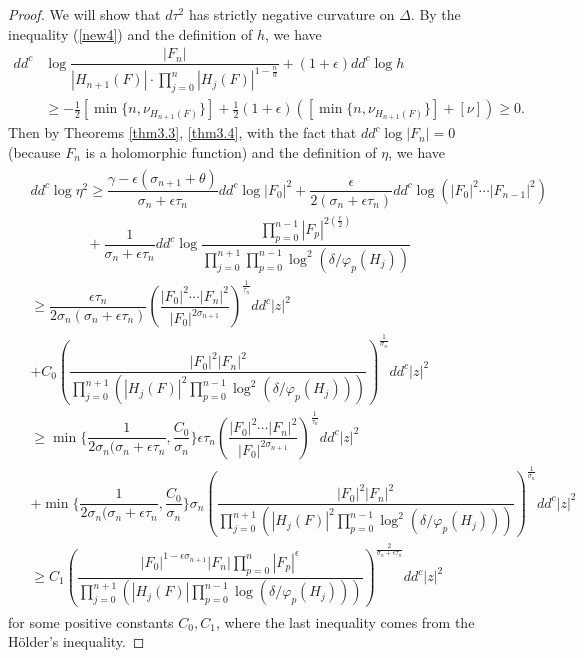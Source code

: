 \documentclass[12pt,article]{amsart}
\numberwithin{equation}{section}
\begin{document}
\begin{proof}
We will show that $d\tau^2$ has strictly negative curvature on $\Delta$. By the inequality (\ref{new4}) and the definition of  $h$, we have
\begin{align*}
dd^c&\log\dfrac{|F_n|}{|H_{n+1}(F)|\cdot\prod_{j=0}^{n}|H_j(F)|^{1-\frac{n}{d}}}+(1+\epsilon)dd^c\log h\\
&\ge -\frac{1}{2}[\min\{n,\nu_{H_{n+1}(F)}\}]+\frac{1}{2}(1+\epsilon)\left([\min\{n,\nu_{H_{n+1}(F)}\}]+[\nu]\right)\ge 0.
\end{align*}
Then by Theorems \ref{thm3.3}, \ref{thm3.4}, with the fact that $dd^c\log|F_n|=0$ (because $F_n$ is a holomorphic function) and the definition of $\eta$, we have
\begin{align}\label{new3}
\begin{split}
&dd^c\log\eta^2\ge\dfrac{\gamma-\epsilon\left(\sigma_{n+1}+\theta\right)}{\sigma_n+\epsilon\tau_n}dd^c\log|F_0|^2+\dfrac{\epsilon}{2(\sigma_n+\epsilon\tau_n)}dd^c\log\left(|F_{0}|^2\cdots|F_{n-1}|^2\right)\\
&\quad\quad\quad\quad +\dfrac{1}{\sigma_n+\epsilon\tau_n}dd^c\log\dfrac{\prod_{p=0}^{n-1}|F_{p}|^{2(\frac{\epsilon}{2})}}{\prod_{j=0}^{n+1}\prod_{p=0}^{n-1}\log^{2}(\delta/\varphi_{p}(H_j))}\\
&\ge\dfrac{\epsilon\tau_n}{2\sigma_n(\sigma_n+\epsilon\tau_n)}\left(\dfrac{|F_0|^2\cdots |F_n|^2}{|F_0|^{2\sigma_{n+1}}}\right)^{\frac{1}{\tau_n}}dd^c|z|^2\\
&+C_0\left (\dfrac{|F_0|^{2}|F_n|^2}{\prod_{j=0}^{n+1}(|H_j(F)|^2\prod_{p=0}^{n-1}\log^2(\delta/\varphi_{p}(H_j)))}\right)^{\frac{1}{\sigma_n}}dd^c|z|^2\\
&\ge\min \{\dfrac{1}{2\sigma_n(\sigma_n+\epsilon\tau_n},\dfrac{C_0}{\sigma_n}\}\epsilon\tau_n\left(\dfrac{|F_0|^2\cdots |F_n|^2}{|F_0|^{2\sigma_{n+1}}}\right)^\frac{1}{\tau_n}dd^c|z|^2\\
&+\min \{\dfrac{1}{2\sigma_n(\sigma_n+\epsilon\tau_n},\dfrac{C_0}{\sigma_n}\}\sigma_n\left (\dfrac{|F_0|^{2}|F_n|^2}{\prod_{j=0}^{n+1}(|H_j(F)|^2\prod_{p=0}^{n-1}\log^2(\delta/\varphi_{p}(H_j)))}\right)^{\frac{1}{\sigma_n}}dd^c|z|^2\\
&\ge C_1\left (\dfrac{|F_{0}|^{1-\epsilon\sigma_{n+1}}|F_n|\prod_{p=0}^n|F_{p}|^\epsilon}{\prod_{j=0}^{n+1}(|H_j(F)|\prod_{p=0}^{n-1}\log(\delta/\varphi_{p}(H_j)))}\right)^{\frac{2}{\sigma_n+\epsilon\tau_n}}dd^c|z|^2
\end{split}
\end{align}
for some positive constants $C_0,C_1$, where the last inequality comes from the H\"{o}lder's inequality.


\end{proof}
\end{document}
